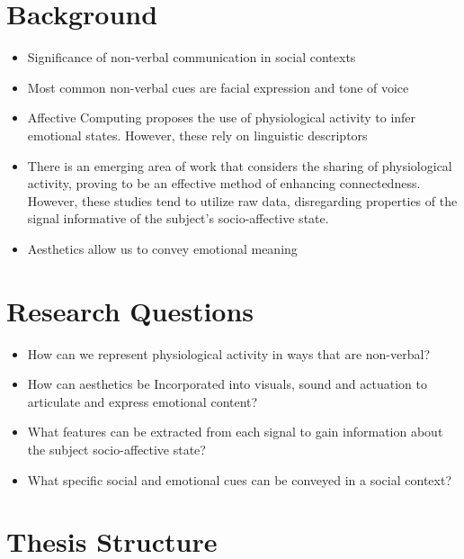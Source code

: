 

\section{Background}
\label{sec:objectives}

\begin{itemize}
  \item Significance of non-verbal communication in social contexts
  \item Most common non-verbal cues are facial expression and tone of voice
  \item Affective Computing proposes the use of physiological activity to infer emotional states. However, these rely on linguistic descriptors
  \item There is an emerging area of work that considers the sharing of physiological activity, proving to be an effective method of enhancing connectedness. However, these studies tend to utilize raw data, disregarding  properties of the signal informative of the subject's socio-affective state.
  \item Aesthetics allow us to convey emotional meaning
\end{itemize}

\section{Research Questions}
\label{sec:research_questions}

\begin{itemize}
  \item How can we represent physiological activity in ways that are non-verbal?
  \item How can aesthetics be Incorporated into visuals, sound and actuation to articulate and express emotional content?
  \item What features can be extracted from each signal to gain information about the subject socio-affective state?
  \item What specific social and emotional cues can be conveyed in a social context?
\end{itemize}

\section{Thesis Structure} %
\label{sec:structure}


